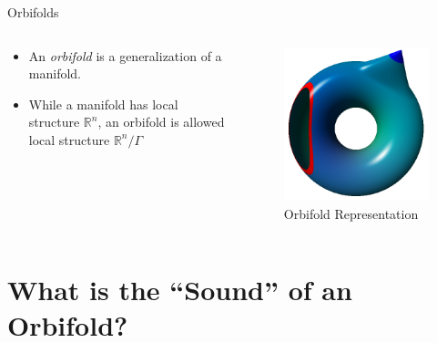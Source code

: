 \documentclass[12pt]{beamer}
\begin{document}
\begin{frame}{Orbifolds}
    \begin{columns}[c]
    \begin{column}[c]{0.5\textwidth}
    \begin{itemize}
        \item An \emph{orbifold} is a generalization of a manifold.
        \item While a manifold has local structure $\mathbb{R}^n$, an
            orbifold is allowed local structure $\mathbb{R}^n/\Gamma$
    \end{itemize}
\end{column}
\begin{column}[c]{0.49\textwidth}
    \begin{figure}
        \includegraphics[width=\textwidth]{images/orbifold_ex.png}
        \caption{Orbifold Representation}
    \end{figure}
\end{column}
\end{columns}
\end{frame}

\section{What is the ``Sound'' of an Orbifold?}
\end{document}
